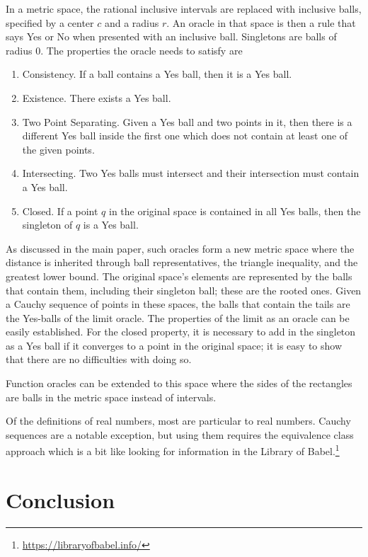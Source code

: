 \documentclass[12pt]{article}
\theoremstyle{remark}
\begin{document}
In a metric space, the rational inclusive intervals are replaced with inclusive balls, specified by a center $c$ and a radius $r$. An oracle in that space is then a rule that says Yes or No when presented with an inclusive ball. Singletons are balls of radius $0$. The properties the oracle needs to satisfy are
\begin{enumerate}
    \item Consistency. If a ball contains a Yes ball, then it is a Yes ball. 
    \item Existence. There exists a Yes ball.
    \item Two Point Separating. Given a Yes ball and two points in it, then there is a different Yes ball inside the first one which does not contain at least one of the given points. 
    \item Intersecting. Two Yes balls must intersect and their intersection must contain a Yes ball.
    \item Closed. If a point $q$ in the original space is contained in all Yes balls, then the singleton of $q$ is a Yes ball.
\end{enumerate}

As discussed in the main paper, such oracles form a new metric space where the distance is inherited through ball representatives, the triangle inequality, and the greatest lower bound. The original space's elements are represented by the balls that contain them, including their singleton ball; these are the rooted ones. Given a Cauchy sequence of points in these spaces, the balls that contain the tails are the Yes-balls of the limit oracle. The properties of the limit as an oracle can be easily established. For the closed property, it is necessary to add in the singleton as a Yes ball if it converges to a point in the original space; it is easy to show that there are no difficulties with doing so. 

Function oracles can be extended to this space where the sides of the rectangles are balls in the metric space instead of intervals. 

Of the definitions of real numbers, most are particular to real numbers. Cauchy sequences are a notable exception, but using them requires the equivalence class approach which is a bit like looking for information in the Library of Babel.\footnote{\url{https://libraryofbabel.info/}} 

\section{Conclusion}
\end{document}
